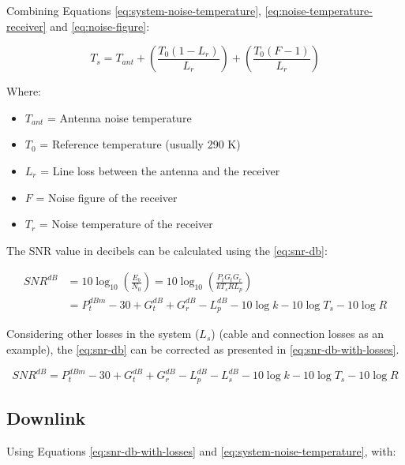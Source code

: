 Combining Equations \ref{eq:system-noise-temperature}, \ref{eq:noise-temperature-receiver} and \ref{eq:noise-figure}:

\begin{equation} \label{eq:system-noise-temp-expanded}
    T_{s} = T_{ant} + \left( \frac{T_{0}(1 - L_{r})}{L_{r}} \right) + \left( \frac{T_{0} (F - 1)}{L_{r}} \right)
\end{equation}

Where:

\begin{itemize}
    \item $T_{ant}$ = Antenna noise temperature
    \item $T_{0}$ = Reference temperature (usually 290 K)
    \item $L_{r}$ = Line loss between the antenna and the receiver
    \item $F$ = Noise figure of the receiver
    \item $T_{r}$ = Noise temperature of the receiver
\end{itemize}

The SNR value in decibels can be calculated using the \autoref{eq:snr-db}:

\begin{equation} \label{eq:snr-db}
    \begin{split}
        SNR^{dB} & = 10\log_{10}\left( \frac{E_{b}}{N_{0}} \right) = 10\log_{10} \left( \frac{P_{t}G_{t}G_{r}}{kT_{s}RL_{p}} \right) \\
                 & = P_{t}^{dBm} - 30 + G_{t}^{dB} + G_{r}^{dB} - L_{p}^{dB} - 10\log k - 10\log T_{s} - 10\log R
    \end{split}
\end{equation}

Considering other losses in the system ($L_{s}$) (cable and connection losses as an example), the \autoref{eq:snr-db} can be corrected as presented in \autoref{eq:snr-db-with-losses}.

\begin{equation} \label{eq:snr-db-with-losses}
    SNR^{dB} = P_{t}^{dBm} - 30 + G_{t}^{dB} + G_{r}^{dB} - L_{p}^{dB} - L_{s}^{dB} - 10\log k - 10\log T_{s} - 10\log R
\end{equation}

\subsection{Downlink}

Using Equations \ref{eq:snr-db-with-losses} and \ref{eq:system-noise-temperature}, with:

